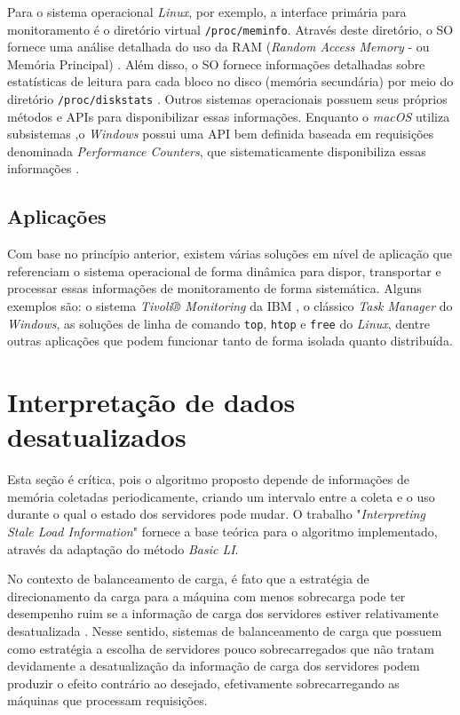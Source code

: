 Para o sistema operacional \textit{Linux}, por exemplo, a interface primária para monitoramento é o diretório virtual \texttt{/proc/meminfo}. Através deste diretório, o SO fornece uma análise detalhada do uso da RAM (\textit{Random Access Memory} - ou Memória Principal) \cite{linux_procfs_doc}. Além disso, o SO fornece informações detalhadas sobre estatísticas de leitura para cada bloco no disco (memória secundária) por meio do diretório \texttt{/proc/diskstats} \cite{linux_iostats_doc}. Outros sistemas operacionais possuem seus próprios métodos e APIs para disponibilizar essas informações. Enquanto o \textit{macOS} utiliza subsistemas \cite{macos_iokit_doc} \cite{macos_virtmem_doc},o \textit{Windows} possui uma API bem definida baseada em requisições denominada \textit{Performance Counters}, que sistematicamente disponibiliza essas informações \cite{windows_disk_counters} \cite{windows_mem_counters}.

\subsection{Aplicações}

Com base no princípio anterior, existem várias soluções em nível de aplicação que referenciam o sistema operacional de forma dinâmica para dispor, transportar e processar essas informações de monitoramento de forma sistemática. Alguns exemplos são: o sistema \textit{Tivoli® Monitoring} da IBM \cite{boss2007cloud}, o clássico \textit{Task Manager} do \textit{Windows}, as soluções de linha de comando \texttt{top}, \texttt{htop} e \texttt{free} do \textit{Linux}, dentre outras aplicações que podem funcionar tanto de forma isolada quanto distribuída.
 
\section{Interpretação de dados desatualizados}

Esta seção é crítica, pois o algoritmo proposto depende de informações de memória coletadas periodicamente, criando um intervalo entre a coleta e o uso durante o qual o estado dos servidores pode mudar. O trabalho "\textit{Interpreting Stale Load Information}" \cite{interpretingStaleLoadInformation2000} fornece a base teórica para o algoritmo implementado, através da adaptação do método \textit{Basic LI}.

No contexto de balanceamento de carga, é fato que a estratégia de direcionamento da carga para a máquina com menos sobrecarga pode ter desempenho ruim se a informação de carga dos servidores estiver relativamente desatualizada \cite{adaptiveLoadSharing1986, analysisDelaysLoadSharing1989, howUsefulIsLoadInformation2000, loadDistributingInLocallyDistributedSystems1993}. Nesse sentido, sistemas de balanceamento de carga que possuem como estratégia a escolha de servidores pouco sobrecarregados que não tratam devidamente a desatualização da informação de carga dos servidores podem produzir o efeito contrário ao desejado, efetivamente sobrecarregando as máquinas que processam requisições.

